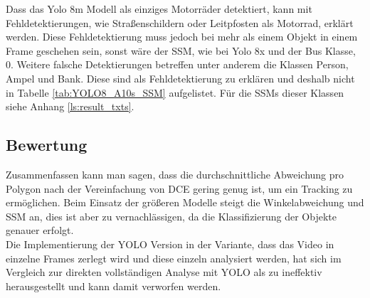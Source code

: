 {\begin{table}[ht]
\begin{tabular}{l|l|l|l|l|l|l}
			\end{tabular}
		\end{table}
		Dass das Yolo 8m Modell als einziges Motorräder detektiert, kann mit Fehldetektierungen, wie Straßenschildern oder Leitpfosten als Motorrad, erklärt werden. Diese Fehldetektierung muss jedoch bei mehr als einem Objekt in einem Frame geschehen sein, sonst wäre der SSM, wie bei Yolo 8x und der Bus Klasse, 0.
		Weitere falsche Detektierungen betreffen unter anderem die Klassen Person, Ampel und Bank. Diese sind als Fehldetektierung zu erklären und deshalb nicht in Tabelle \ref{tab:YOLO8_A10s_SSM} aufgelistet. Für die SSMs dieser Klassen siehe Anhang \ref{ls:result_txts}.
	}
	\subsection{Bewertung}
	{ %
	
	Zusammenfassen kann man sagen, dass die durchschnittliche Abweichung pro Polygon nach der Vereinfachung von DCE gering genug ist, um ein Tracking zu ermöglichen. Beim Einsatz der größeren Modelle steigt die Winkelabweichung und SSM an, dies ist aber zu vernachlässigen, da die Klassifizierung der Objekte genauer erfolgt.  \\
	Die Implementierung der YOLO Version in der Variante, dass das Video in einzelne Frames zerlegt wird und diese einzeln analysiert werden, hat sich im Vergleich zur direkten vollständigen Analyse mit YOLO als zu ineffektiv herausgestellt und kann damit verworfen werden. }

		
	
		


			
			
				











